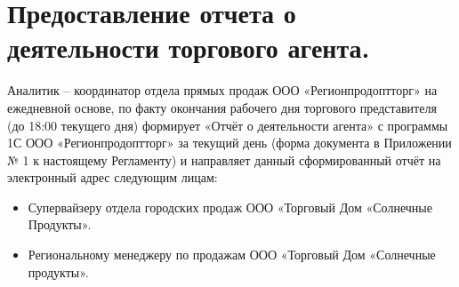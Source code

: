 \section{Предоставление отчета о деятельности торгового агента.}
Аналитик – координатор отдела прямых продаж ООО «Регионпродоптторг» на ежедневной основе, по факту окончания рабочего дня торгового представителя (до 18:00 текущего дня)  формирует «Отчёт о деятельности агента» с программы 1С ООО «Регионпродоптторг» за текущий день (форма документа в Приложении № 1 к настоящему Регламенту) и направляет данный сформированный отчёт на электронный адрес следующим лицам:
\begin{itemize}[topsep=0pt, itemsep=-0.5ex]
	\item Супервайзеру отдела городских продаж ООО «Торговый Дом «Солнечные Продукты».
	\item Региональному менеджеру по продажам ООО «Торговый Дом «Солнечные продукты».
\end{itemize}
